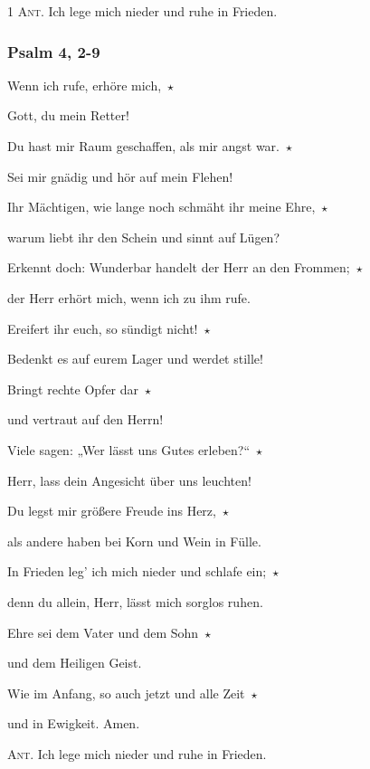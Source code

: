 \noindent \textsc{1 Ant.} Ich lege mich nieder und ruhe in Frieden.

\subsubsection{Psalm 4, 2-9}

\noindent Wenn ich rufe, erhöre mich,~$\star$~\nopagebreak

Gott, du mein Retter! 

\noindent Du hast mir Raum geschaffen, als mir angst war.~$\star$~\nopagebreak

Sei mir gnädig und hör auf mein Flehen!

\noindent Ihr Mächtigen, wie lange noch schmäht ihr meine Ehre,~$\star$~\nopagebreak

warum liebt ihr den Schein und sinnt auf Lügen?

\noindent Erkennt doch: Wunderbar handelt der Herr an den Frommen;~$\star$~\nopagebreak

der Herr erhört mich, wenn ich zu ihm rufe.

\noindent Ereifert ihr euch, so sündigt nicht!~$\star$~\nopagebreak

Bedenkt es auf eurem Lager und werdet stille!

\noindent Bringt rechte Opfer dar~$\star$~\nopagebreak

und vertraut auf den Herrn!

\noindent Viele sagen: „Wer lässt uns Gutes erleben?“~$\star$~\nopagebreak

Herr, lass dein Angesicht über uns leuchten!

\noindent Du legst mir größere Freude ins Herz,~$\star$~\nopagebreak

als andere haben bei Korn und Wein in Fülle.

\noindent In Frieden leg’ ich mich nieder und schlafe ein;~$\star$~\nopagebreak

denn du allein, Herr, lässt mich sorglos ruhen.

\noindent Ehre sei dem Vater und dem Sohn~$\star$~\nopagebreak

und dem Heiligen Geist.

\noindent Wie im Anfang, so auch jetzt und alle Zeit~$\star$~\nopagebreak

und in Ewigkeit. Amen.

\vspace{10pt}

\noindent \textsc{Ant.} Ich lege mich nieder und ruhe in Frieden. 

